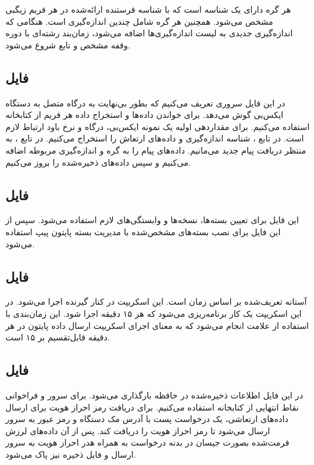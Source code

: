 هر گره دارای یک شناسه است که با شناسه فرستنده ارائه‌شده در هر فریم زیگبی مشخص می‌شود. همچنین هر گره شامل چندین اندازه‌گیری است. هنگامی که اندازه‌گیری جدیدی به لیست اندازه‌گیری‌ها اضافه می‌شود، زمان‌بند رشته‌ای با دوره وقفه مشخص و تابع  شروع می‌شود.

\subsection{فایل }

در این فایل سروری تعریف می‌کنیم که بطور بی‌نهایت به درگاه  متصل به دستگاه ایکس‌بی گوش می‌دهد. برای خواندن داده‌ها و استخراج داده هر فریم از کتابخانه  استفاده می‌کنیم. برای مقداردهی اولیه یک نمونه ایکس‌بی، درگاه و نرخ باود ارتباط لازم است. در تابع ، شناسه اندازه‌گیری و داده‌های ارتعاش را استخراج می‌کنیم. در تابع ، به منتظر دریافت پیام جدید می‌مانیم. داده‌های پیام را به گره و اندازه‌گیری مربوطه اضافه می‌کنیم و سپس داده‌های ذخیره‌شده را بروز می‌کنیم.

\subsection{فایل }

این فایل برای تعیین بسته‌ها، نسخه‌ها و وابستگی‌های لازم استفاده می‌شود. سپس از این فایل برای نصب بسته‌های مشخص‌شده با مدیریت بسته پایتون پیپ استفاده می‌شود.

\subsection{فایل }

آستانه تعریف‌شده بر اساس زمان است. این اسکریپت در کنار گیرنده اجرا می‌شود. در این اسکریپت یک کار  برنامه‌ریزی می‌شود که هر ۱۵ دقیقه اجرا شود. این زمان‌بندی با استفاده از علامت  انجام می‌شود که به معنای اجرای اسکریپت ارسال داده پایتون در هر دقیقه قابل‌تقسیم بر ۱۵ است.

\subsection{فایل }

در این فایل اطلاعات ذخیره‌شده در حافظه بارگذاری می‌شود. برای سرور و فراخوانی نقاط انتهایی  از کتابخانه  استفاده می‌کنیم. برای دریافت رمز احراز هویت  برای ارسال داده‌های ارتعاشی، یک درخواست پست با آدرس مک دستگاه و رمز عبور به سرور ارسال می‌شود تا رمز احراز هویت را دریافت کند. پس از آن داده‌های لرزش فرمت‌شده بصورت جیسان در بدنه درخواست به همراه هدر احراز هویت به سرور ارسال و فایل ذخیره نیز پاک می‌شود.

